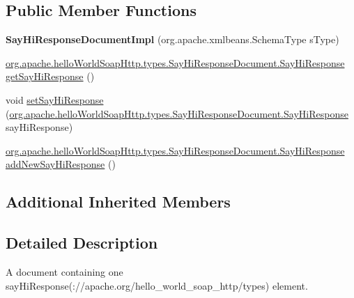 \subsection*{Public Member Functions}
\begin{DoxyCompactItemize}
\item 
\hypertarget{classorg_1_1apache_1_1hello_world_soap_http_1_1types_1_1impl_1_1_say_hi_response_document_impl_a0569971a1530ed4a12e6a7298748249f}{}{\bfseries Say\+Hi\+Response\+Document\+Impl} (org.\+apache.\+xmlbeans.\+Schema\+Type s\+Type)\label{classorg_1_1apache_1_1hello_world_soap_http_1_1types_1_1impl_1_1_say_hi_response_document_impl_a0569971a1530ed4a12e6a7298748249f}

\item 
\hyperlink{interfaceorg_1_1apache_1_1hello_world_soap_http_1_1types_1_1_say_hi_response_document_1_1_say_hi_response}{org.\+apache.\+hello\+World\+Soap\+Http.\+types.\+Say\+Hi\+Response\+Document.\+Say\+Hi\+Response} \hyperlink{classorg_1_1apache_1_1hello_world_soap_http_1_1types_1_1impl_1_1_say_hi_response_document_impl_aaeee4c7aa048b1d7b0eb61cb18b57b9c}{get\+Say\+Hi\+Response} ()
\item 
void \hyperlink{classorg_1_1apache_1_1hello_world_soap_http_1_1types_1_1impl_1_1_say_hi_response_document_impl_a4fa1841289fc59b6510dd19925a5c848}{set\+Say\+Hi\+Response} (\hyperlink{interfaceorg_1_1apache_1_1hello_world_soap_http_1_1types_1_1_say_hi_response_document_1_1_say_hi_response}{org.\+apache.\+hello\+World\+Soap\+Http.\+types.\+Say\+Hi\+Response\+Document.\+Say\+Hi\+Response} say\+Hi\+Response)
\item 
\hyperlink{interfaceorg_1_1apache_1_1hello_world_soap_http_1_1types_1_1_say_hi_response_document_1_1_say_hi_response}{org.\+apache.\+hello\+World\+Soap\+Http.\+types.\+Say\+Hi\+Response\+Document.\+Say\+Hi\+Response} \hyperlink{classorg_1_1apache_1_1hello_world_soap_http_1_1types_1_1impl_1_1_say_hi_response_document_impl_a9833cd09061fd9eb011a6a16d86568cd}{add\+New\+Say\+Hi\+Response} ()
\end{DoxyCompactItemize}
\subsection*{Additional Inherited Members}


\subsection{Detailed Description}
A document containing one say\+Hi\+Response(\+://apache.org/hello\+\_\+world\+\_\+soap\+\_\+http/types) element.

